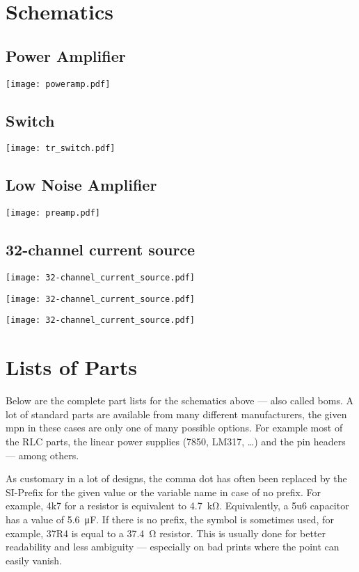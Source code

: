 \chapter{Schematics}
\section{Power Amplifier}
\texttt{[image: poweramp.pdf]}

\section{Switch}
\texttt{[image: tr\_switch.pdf]}

\section{Low Noise Amplifier}
\texttt{[image: preamp.pdf]}

\section{32-channel current source}
\texttt{[image: 32-channel\_current\_source.pdf]}

\texttt{[image: 32-channel\_current\_source.pdf]}

\texttt{[image: 32-channel\_current\_source.pdf]}

\chapter{Lists of Parts}
Below are the complete part lists for the schematics above --- also called \acrshort{bom}s. A lot of standard parts are available from many different manufacturers, the given \acrfull{mpn} in these cases are only one of many possible options. For example most of the RLC parts, the linear power supplies (7850, LM317, \ldots) and the pin headers --- among others.

As customary in a lot of designs, the comma dot has often been replaced by the SI-Prefix for the given value or the variable name in case of no prefix. For example, 4k7 for a resistor is equivalent to \qty{4.7}{\kilo\ohm}. Equivalently, a 5u6 capacitor has a value of \qty{5.6}{\micro\farad}. If there is no prefix, the symbol is sometimes used, for example, 37R4 is equal to a \qty{37.4}{\ohm} resistor. This is usually done for better readability and less ambiguity --- especially on bad prints where the point can easily vanish.

